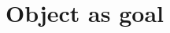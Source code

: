 \documentclass[../main.tex]{subfiles}
\begin{document}

\section{Object as goal}\label{sec:object-goal}
\end{document}
